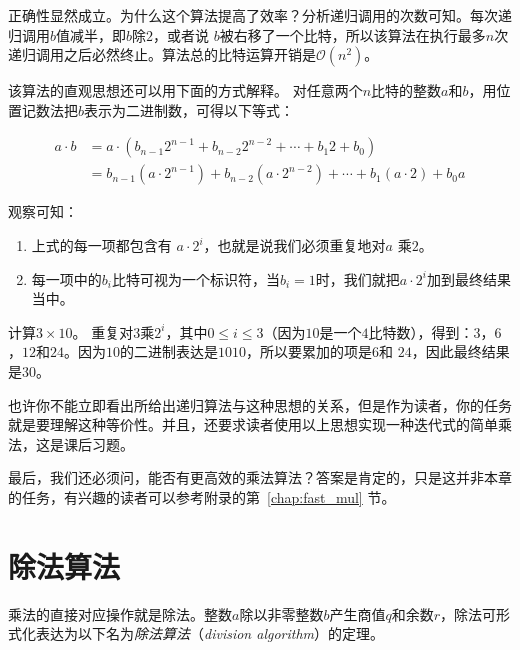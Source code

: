 \begin{center}
	
\end{center}

正确性显然成立。为什么这个算法提高了效率？分析递归调用的次数可知。每次递归调用$b$值减半，即$b$除$2$，或者说 $b$被右移了一个比特，所以该算法在执行最多$n$次递归调用之后必然终止。算法总的比特运算开销是$\mathcal{O}(n^2)$。

该算法的直观思想还可以用下面的方式解释。
对任意两个$n$比特的整数$a$和$b$，用位置记数法把$b$表示为二进制数，可得以下等式：

		\begin{align*}
	      a \cdot b &= a \cdot (b_{n-1} 2^{n-1} + b_{n-2} 2^{n-2} + \cdots + b_1 2 + b_0)\\
	                      &= b_{n-1}(a \cdot 2^{n-1}) + b_{n-2} (a \cdot 2^{n-2})+ \cdots + b_1(a\cdot 2) + b_0 a
		\end{align*}

观察可知：
\begin{enumerate}
\item 上式的每一项都包含有 $a \cdot 2^i$，也就是说我们必须重复地对$a$ 乘$2$。

\item 每一项中的$b_i$比特可视为一个标识符，当$b_i = 1$时，我们就把$a\cdot 2^i$加到最终结果当中。
\end{enumerate}

\begin{example}
		计算$3 \times 10$。
		重复对$3$乘$2^i$，其中$0 \le i \le 3$（因为$10$是一个$4$比特数），得到：$3$，$6$，$12$和$24$。因为$10$的二进制表达是$1010$，所以要累加的项是$6$和 $24$，因此最终结果是$30$。
\end{example}

也许你不能立即看出所给出递归算法与这种思想的关系，但是作为读者，你的任务就是要理解这种等价性。并且，还要求读者使用以上思想实现一种迭代式的简单乘法，这是课后习题。

最后，我们还必须问，能否有更高效的乘法算法？答案是肯定的，只是这并非本章的任务，有兴趣的读者可以参考附录的第~\ref{chap:fast_mul} 节。

\section{除法算法}
\label{sec:Division}
乘法的直接对应操作就是除法。整数$a$除以非零整数$b$产生商值$q$和余数$r$，除法可形式化表达为以下名为\emph{除法算法}（\emph{division algorithm}）的定理。

